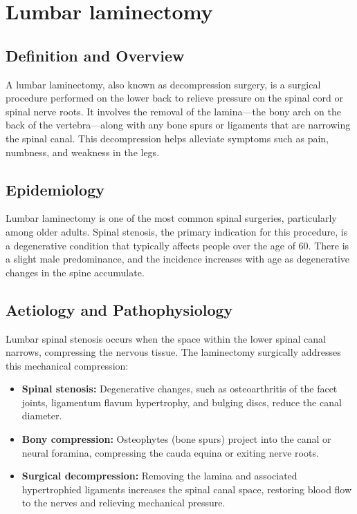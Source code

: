 \chapter{Lumbar laminectomy}

\section*{Definition and Overview}
A lumbar laminectomy, also known as decompression surgery, is a surgical procedure performed on the lower back to relieve pressure on the spinal cord or spinal nerve roots. It involves the removal of the lamina---the bony arch on the back of the vertebra---along with any bone spurs or ligaments that are narrowing the spinal canal. This decompression helps alleviate symptoms such as pain, numbness, and weakness in the legs.

\section*{Epidemiology}
Lumbar laminectomy is one of the most common spinal surgeries, particularly among older adults. Spinal stenosis, the primary indication for this procedure, is a degenerative condition that typically affects people over the age of 60. There is a slight male predominance, and the incidence increases with age as degenerative changes in the spine accumulate.

\section*{Aetiology and Pathophysiology}
Lumbar spinal stenosis occurs when the space within the lower spinal canal narrows, compressing the nervous tissue. The laminectomy surgically addresses this mechanical compression:

\begin{itemize}
    \item \textbf{Spinal stenosis:} Degenerative changes, such as osteoarthritis of the facet joints, ligamentum flavum hypertrophy, and bulging discs, reduce the canal diameter.
    \item \textbf{Bony compression:} Osteophytes (bone spurs) project into the canal or neural foramina, compressing the cauda equina or exiting nerve roots.
    \item \textbf{Surgical decompression:} Removing the lamina and associated hypertrophied ligaments increases the spinal canal space, restoring blood flow to the nerves and relieving mechanical pressure.
\end{itemize}

